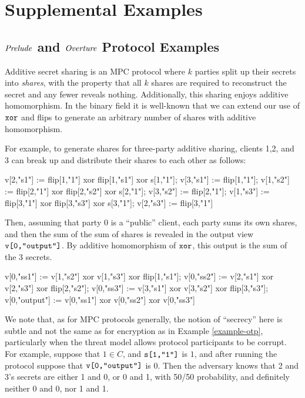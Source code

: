 \section{Supplemental Examples}

\subsection{$\mathit{Prelude}$ and $\mathit{Overture}$ Protocol Examples}

\begin{example}
    \label{example-he}
Additive secret sharing is an MPC protocol where $k$ parties split up
their secrets into \emph{shares}, with the property that all $k$
shares are required to reconstruct the secret and any fewer reveals
nothing. Additionally, this sharing enjoys additive homomorphism. In
the binary field it is well-known that we can extend our use
of $\texttt{xor}$ and flips to generate an arbitrary number of shares
with additive homomorphism. 

For example, to generate shares for three-party additive sharing,
clients 1,2, and 3 can break up and distribute their shares to
each other as follows:
{\small
\begin{verbatimtab}
     v[2,"s1"] := flip[1,"1"] xor flip[1,"s1"] xor s[1,"1"];
     v[3,"s1"] := flip[1,"1"];
     v[1,"s2"] := flip[2,"1"] xor flip[2,"s2"] xor s[2,"1"];
     v[3,"s2"] := flip[2,"1"];
     v[1,"s3"] := flip[3,"1"] xor flip[3,"s3"] xor s[3,"1"];
     v[2,"s3"] := flip[3,"1"] \end{verbatimtab}
}
Then, assuming that party 0 is a ``public'' client, each party sums
its own shares, and then the sum of the sum of shares is revealed
in the output view $\texttt{v[0,"output"]}$. By additive homomorphism of
$\texttt{xor}$, this output is the sum of the 3 secrets.
{\small
\begin{verbatimtab}
     v[0,"ss1"] := v[1,"s2"] xor v[1,"s3"] xor flip[1,"s1"];
     v[0,"ss2"] := v[2,"s1"] xor v[2,"s3"] xor flip[2,"s2"];
     v[0,"ss3"] := v[3,"s1"] xor v[3,"s2"] xor flip[3,"s3"];
     v[0,"output"] := v[0,"ss1"] xor v[0,"ss2"] xor v[0,"ss3"] \end{verbatimtab}
}
We note that, as for MPC protocols generally, the notion of
``secrecy'' here is subtle and not the same as for encryption as in
Example \ref{example-otp}, particularly when the threat model allows
protocol participants to be corrupt. For example, suppose that $1 \in C$, and
$\texttt{s[1,"1"]}$ is $1$, and after running the protocol suppose that
$\texttt{v[0,"output"]}$ is 0. Then the adversary knows that 2 and 3's secrets
are either 1 and 0, or 0 and 1, with 50/50 probability, and definitely
neither 0 and 0, nor 1 and 1. 
\end{example}

